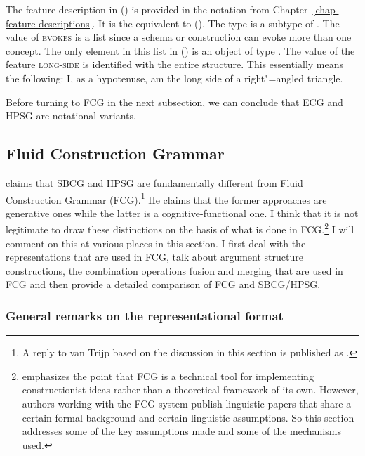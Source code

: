 The feature description in () is provided in the notation from
Chapter~\ref{chap-feature-descriptions}. It is the equivalent to
().
\ea
{} 
\z
The type  is a subtype of .
The value of \textsc{evokes} is a list since a schema or construction can evoke more than one concept. The only element in this list in ()
is an object of type . The value of the feature \textsc{long-side} is identified with the entire structure. This essentially
means the following: I, as a hypotenuse, am the long side of a right"=angled triangle.

Before turning to FCG in the next subsection, we can conclude that ECG and HPSG are notational variants.



\subsection{Fluid Construction Grammar}
\label{sec-fcg}

 claims that SBCG and HPSG are fundamentally
different from Fluid Construction Grammar (FCG).\footnote{%
  A reply to van Trijp based on the discussion in this section is published as .%
}
He claims that the former approaches are generative ones while the latter is a
cognitive-functional one. I think that it is not legitimate to draw these distinctions on the basis
of what is done in FCG.\footnote{\label{Steels-FCG-System}%
  \citet[]{Steels2013a} emphasizes the point that FCG is a technical tool for implementing constructionist ideas rather than
  a theoretical framework of its own. However, authors working with the FCG system publish linguistic papers
  that share a certain formal background and certain linguistic assumptions. So this section
  addresses some of the key assumptions made and some of the mechanisms used.
} I will comment on this at various places in this section. I first deal with
the representations that are used in FCG, talk about argument structure constructions, the
combination operations fusion and merging that are used in FCG and then provide a detailed comparison of FCG and
SBCG/HPSG.


\subsubsection{General remarks on the representational format}

